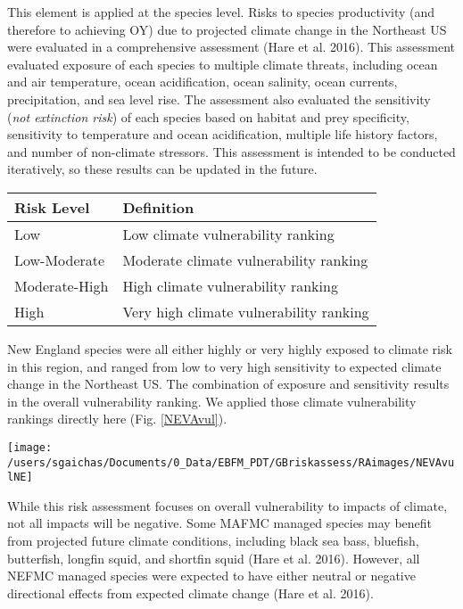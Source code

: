 \documentclass[11pt,]{article}
\let\origfigure\figure
\let\endorigfigure\endfigure
\renewenvironment{figure}[1][2] {
    \expandafter\origfigure\expandafter[H]
} {
    \endorigfigure
}
\begin{document}
This element is applied at the species level. Risks to species
productivity (and therefore to achieving OY) due to projected climate
change in the Northeast US were evaluated in a comprehensive assessment
(Hare et al. 2016). This assessment evaluated exposure of each species
to multiple climate threats, including ocean and air temperature, ocean
acidification, ocean salinity, ocean currents, precipitation, and sea
level rise. The assessment also evaluated the sensitivity (\emph{not
extinction risk}) of each species based on habitat and prey specificity,
sensitivity to temperature and ocean acidification, multiple life
history factors, and number of non-climate stressors. This assessment is
intended to be conducted iteratively, so these results can be updated in
the future.

\begin{longtable}[]{@{}ll@{}}
\toprule
Risk Level & Definition\tabularnewline
\midrule
\endhead
Low & Low climate vulnerability ranking\tabularnewline
Low-Moderate & Moderate climate vulnerability ranking\tabularnewline
Moderate-High & High climate vulnerability ranking\tabularnewline
High & Very high climate vulnerability ranking\tabularnewline
\bottomrule
\end{longtable}

New England species were all either highly or very highly exposed to
climate risk in this region, and ranged from low to very high
sensitivity to expected climate change in the Northeast US. The
combination of exposure and sensitivity results in the overall
vulnerability ranking. We applied those climate vulnerability rankings
directly here (Fig. \ref{NEVAvul}).

\begin{figure}

{\centering \texttt{[image: /users/sgaichas/Documents/0\_Data/EBFM\_PDT/GBriskassess/RAimages/NEVAvulNE]} 

}

\caption{Results of Northeast Climate Vulnerability Analysis (Hare et al. 2016) for Mid-Atlantic species \label{NEVAvul}}\label{fig:unnamed-chunk-9}
\end{figure}

While this risk assessment focuses on overall vulnerability to impacts
of climate, not all impacts will be negative. Some MAFMC managed species
may benefit from projected future climate conditions, including black
sea bass, bluefish, butterfish, longfin squid, and shortfin squid (Hare
et al. 2016). However, all NEFMC managed species were expected to have
either neutral or negative directional effects from expected climate
change (Hare et al. 2016).
\end{document}
